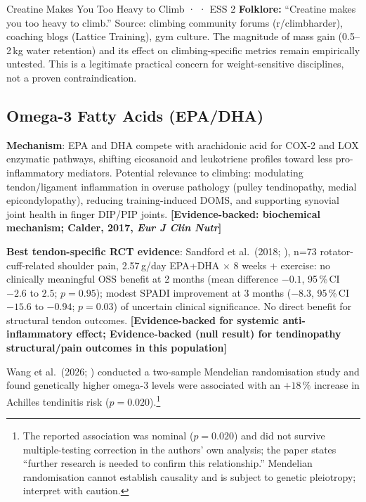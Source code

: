 \begin{folklorebox}{Creatine Makes You Too Heavy to Climb · \folkloreverified · ESS 2}
\textbf{Folklore:} ``Creatine makes you too heavy to climb.'' Source: climbing community forums (r/climbharder), coaching blogs (Lattice Training), gym culture. The magnitude of mass gain (0.5--2\,kg water retention) and its effect on climbing-specific metrics remain empirically untested. This is a legitimate practical concern for weight-sensitive disciplines, not a proven contraindication.
\end{folklorebox}

\subsection{Omega-3 Fatty Acids (EPA/DHA)}
\label{subsec:omega3}

\textbf{Mechanism}: EPA and DHA compete with arachidonic acid for COX-2 and LOX enzymatic pathways, shifting eicosanoid and leukotriene profiles toward less pro-inflammatory mediators. Potential relevance to climbing: modulating tendon/ligament inflammation in overuse pathology (pulley tendinopathy, medial epicondylopathy), reducing training-induced DOMS, and supporting synovial joint health in finger DIP/PIP joints. \textbf{[Evidence-backed: biochemical mechanism; Calder, 2017, \textit{Eur J Clin Nutr}]}

\textbf{Best tendon-specific RCT evidence}: Sandford et al.\ (2018; \cite{SSWL18}), n=73 rotator-cuff-related shoulder pain, 2.57\,g/day EPA+DHA $\times$ 8 weeks $+$ exercise: no clinically meaningful OSS benefit at 2 months (mean difference $-0.1$, 95\,\%\,CI $-2.6$ to $2.5$; $p{=}0.95$); modest SPADI improvement at 3 months ($-8.3$, 95\,\%\,CI $-15.6$ to $-0.94$; $p{=}0.03$) of uncertain clinical significance. No direct benefit for structural tendon outcomes. \textbf{[Evidence-backed for systemic anti-inflammatory effect; Evidence-backed (null result) for tendinopathy structural/pain outcomes in this population]}

Wang et al.\ (2026; \cite{WLZ+26}) conducted a two-sample Mendelian randomisation study and found genetically higher omega-3 levels were associated with an $+18\,\%$ increase in Achilles tendinitis risk ($p{=}0.020$).\footnote{The reported association was nominal ($p{=}0.020$) and did not survive multiple-testing correction in the authors' own analysis; the paper states ``further research is needed to confirm this relationship.'' Mendelian randomisation cannot establish causality and is subject to genetic pleiotropy; interpret with caution.}

